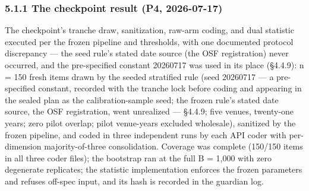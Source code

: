 \subsubsection{5.1.1 The checkpoint result (P4, 2026-07-17)}\label{the-checkpoint-result-p4-2026-07-17}

The checkpoint's tranche draw, sanitization, raw-arm coding, and dual statistic executed per the frozen pipeline and thresholds, with one documented protocol discrepancy --- the seed rule's stated date source (the OSF registration) never occurred, and the pre-specified constant 20260717 was used in its place (\S{}4.4.9): n = 150 fresh items drawn by the seeded stratified rule (seed 20260717 --- a pre-specified constant, recorded with the tranche lock before coding and appearing in the sealed plan as the calibration-sample seed; the frozen rule's stated date source, the OSF registration, went unrealized --- \S{}4.4.9; five venues, twenty-one years; zero pilot overlap; pilot venue-years excluded wholesale), sanitized by the frozen pipeline, and coded in three independent runs by each API coder with per-dimension majority-of-three consolidation. Coverage was complete (150/150 items in all three coder files); the bootstrap ran at the full B = 1,000 with zero degenerate replicates; the statistic implementation enforces the frozen parameters and refuses off-spec input, and its hash is recorded in the guardian log.

